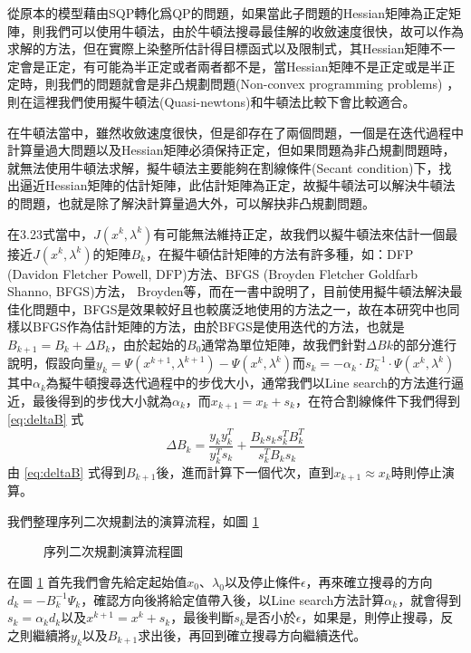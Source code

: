 從原本的模型藉由SQP轉化爲QP的問題，如果當此子問題的Hessian矩陣為正定矩陣，則我們可以使用牛頓法，由於牛頓法搜尋最佳解的收斂速度很快，故可以作為求解的方法，但在實際上染整所估計得目標函式以及限制式，其Hessian矩陣不一定會是正定，有可能為半正定或者兩者都不是，當Hessian矩陣不是正定或是半正定時，則我們的問題就會是非凸規劃問題(Non-convex programming problems)
，則在這裡我們使用擬牛頓法(Quasi-newtons)和牛頓法比較下會比較適合。

在牛頓法當中，雖然收斂速度很快，但是卻存在了兩個問題，一個是在迭代過程中計算量過大問題以及Hessian矩陣必須保持正定，但如果問題為非凸規劃問題時，就無法使用牛頓法求解，擬牛頓法主要能夠在割線條件(Secant condition)下，找出逼近Hessian矩陣的估計矩陣，此估計矩陣為正定，故擬牛頓法可以解決牛頓法的問題，也就是除了解決計算量過大外，可以解抉非凸規劃問題。

在3.23式當中，$J(x^{k},\lambda^{k})$有可能無法維持正定，故我們以擬牛頓法來估計一個最接近$J(x^{k},\lambda^{k})$的矩陣$B_{k}$，在擬牛頓估計矩陣的方法有許多種，如：DFP (Davidon Fletcher Powell, DFP)方法、BFGS (Broyden Fletcher Goldfarb Shanno, BFGS)方法， Broyden等，而在\cite{Nocedal.etc}一書中說明了，目前使用擬牛頓法解決最佳化問題中，BFGS是效果較好且也較廣泛地使用的方法之一，故在本研究中也同樣以BFGS作為估計矩陣的方法，由於BFGS是使用迭代的方法，也就是$B_{k+1}=B_{k}+\Delta B_{k}$，由於起始的$B_{0}$通常為單位矩陣，故我們針對$\Delta B{k}$的部分進行說明，假設向量$y_k=\Psi(x^{k+1},\lambda^{k+1})-\Psi(x^{k},\lambda^{k})$而$s_{k}= - \alpha_{k} \cdot B_{k}^{-1} \cdot \Psi(x^{k},\lambda^{k})$其中$\alpha_{k}$為擬牛頓搜尋迭代過程中的步伐大小，通常我們以Line search的方法進行逼近，最後得到的步伐大小就為$\alpha_{k}$，而$x_{k+1}=x_{k}+s_{k}$，在符合割線條件下我們得到 \ref{eq:deltaB} 式
\begin{equation}
\Delta B_{k}=\frac{y_{k}y_{k}^{T}}{y_{k}^{T}s_{k}}+\frac{B_{k}s_{k}s_{k}^{T}B_{k}^{T}}{s_{k}^{T}B_{k}s_{k}}
\label{eq:deltaB}
\end{equation}
由 \ref{eq:deltaB} 式得到$B_{k+1}$後，進而計算下一個代次，直到$x_{k+1} \approx x_{k}$時則停止演算。

我們整理序列二次規劃法的演算流程，如圖 \ref{fig:flow3}
\begin{figure} 
\centering

\caption{序列二次規劃演算流程圖}
\label{fig:flow3}
\end{figure}
在圖 \ref{fig:flow3} 首先我們會先給定起始值$x_{0}$、$\lambda_{0}$以及停止條件$\epsilon$，再來確立搜尋的方向$d_{k}=-B_{k}^{-1}\Psi_{k}$，確認方向後將給定值帶入後，以Line search方法計算$\alpha_{k}$，就會得到$s_{k}=\alpha_{k}d_{k}$以及$x^{k+1}=x^{k}+s_{k}$，最後判斷$s_{k}$是否小於$\epsilon$，如果是，則停止搜尋，反之則繼續將$y_{k}$以及$B_{k+1}$求出後，再回到確立搜尋方向繼續迭代。